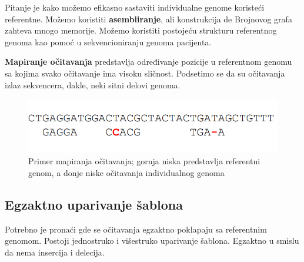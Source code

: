 \fi 

Pitanje je kako možemo efikasno sastaviti individualne genome koristeći referentne. Možemo koristiti \textbf{asembliranje}, ali konstrukcija de Brojnovog grafa zahteva mnogo memorije. Možemo koristiti postojeću strukturu referentnog genoma kao pomoć u sekvencioniranju genoma pacijenta.

\textbf{Mapiranje očitavanja} predstavlja određivanje pozicije u referentnom genomu sa kojima svako očitavanje ima visoku sličnost. Podsetimo se da su očitavanja izlaz sekvencera, dakle, neki sitni delovi genoma. 

\begin{figure}[h!]
\centering
\includegraphics[scale=0.5]{poglavlja/9/slike/mapiranjeOcitavanja.png}
\caption{Primer mapiranja očitavanja; gornja niska predstavlja referentni genom, a donje niske očitavanja individualnog genoma}
\label{slika:X}
\end{figure}

\subsection{Egzaktno uparivanje šablona}
Potrebno je pronaći gde se očitavanja egzaktno poklapaju sa referentnim genomom. Postoji jednostruko i višestruko uparivanje šablona. Egzaktno u smislu da nema insercija i delecija.

